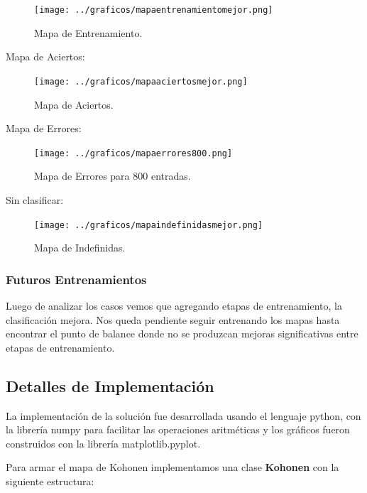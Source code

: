 \begin{figure}[H]
  \centering
  \texttt{[image: ../graficos/mapaentrenamientomejor.png]}
  \caption{Mapa de Entrenamiento.}
  \label{fig:mapa train}
\end{figure}


Mapa de Aciertos:

\begin{figure}[H]
  \centering
  \texttt{[image: ../graficos/mapaaciertosmejor.png]}
  \caption{Mapa de Aciertos.}
  \label{fig:mapa aciertos}
\end{figure}

Mapa de Errores:


\begin{figure}[H]
  \centering
  \texttt{[image: ../graficos/mapaerrores800.png]}
  \caption{Mapa de Errores para 800 entradas.}
  \label{fig:mapa errores 800}
\end{figure}

Sin clasificar:


\begin{figure}[H]
  \centering
  \texttt{[image: ../graficos/mapaindefinidasmejor.png]}
  \caption{Mapa de Indefinidas.}
  \label{fig:mapa indefinidas}
\end{figure}


\subsubsection{Futuros Entrenamientos}

Luego de analizar los casos vemos que agregando etapas de entrenamiento, la clasificación mejora.
Nos queda pendiente seguir entrenando los mapas hasta encontrar el punto de balance donde no se
produzcan mejoras significativas entre etapas de entrenamiento.


\subsection{Detalles de Implementación}

La implementación de la solución fue desarrollada usando el lenguaje python,
con la librería numpy para facilitar las operaciones aritméticas y los gráficos
fueron construidos con la librería matplotlib.pyplot.

Para armar el mapa de Kohonen implementamos una clase \textbf{Kohonen} con la siguiente estructura:

